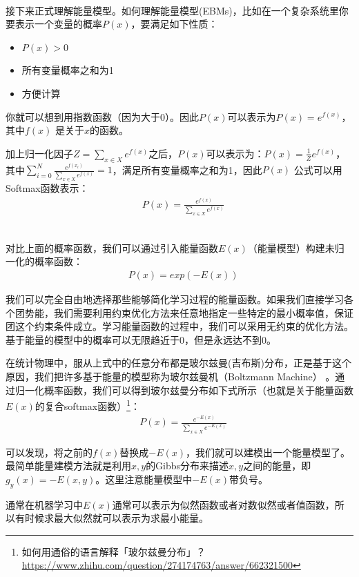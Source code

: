 \quad \\

接下来正式理解能量模型。如何理解能量模型(EBMs)，比如在一个复杂系统里你要表示一个变量的概率$P(x)$，要满足如下性质：
\begin{itemize}
    \item $P(x)> 0$
    \item 所有变量概率之和为1
    \item 方便计算
\end{itemize}

你就可以想到用指数函数（因为大于0）。因此$P(x)$可以表示为$P(x) = e^{f(x)}$，其中$f(x)$ 是关于$x$的函数。

加上归一化因子$Z = \sum_{x \in X}e^{f(x)}$之后，$P(x)$可以表示为：$P(x) = \frac{1}{Z}e^{f(x)}$，其中$\sum_{i=0}^N \frac{e^{f(x_i)}}{\sum_{x \in X} e^{f(x)}} = 1$，满足所有变量概率之和为1，因此$P(x)$ 公式可以用Softmax函数表示：
\begin{align}
&P(x) = \frac{e^{f(x)}}{\sum_{x \in X}e^{f(x)}}
\end{align}

\quad \\

对比上面的概率函数，我们可以通过引入能量函数$E(x)$（能量模型）构建未归一化的概率函数：
\begin{align}
&P(x) = exp(-E(x))
\end{align}

我们可以完全自由地选择那些能够简化学习过程的能量函数。如果我们直接学习各个团势能，我们需要利用约束优化方法来任意地指定一些特定的最小概率值，保证团这个约束条件成立。学习能量函数的过程中，我们可以采用无约束的优化方法。基于能量的模型中的概率可以无限趋近于0，但是永远达不到0。

在统计物理中，服从上式中的任意分布都是玻尔兹曼(吉布斯)分布，正是基于这个原因，我们把许多基于能量的模型称为玻尔兹曼机（Boltzmann Machine） 。通过归一化概率函数，我们可以得到玻尔兹曼分布如下式所示（也就是关于能量函数$E(x)$的复合softmax函数）\footnote{如何用通俗的语言解释「玻尔兹曼分布」？\url{https://www.zhihu.com/question/274174763/answer/662321500}}：
\begin{align}
&P(x) = \frac{e^{-E(x)}}{\sum_{x \in X}e^{-E(x)}}
\end{align}

可以发现，将之前的$f(x)$替换成$-E(x)$，我们就可以建模出一个能量模型了。最简单能量建模方法就是利用$x,y$的Gibbs分布来描述$x,y$之间的能量，即$g_y(x) = -E(x,y)$。这里注意能量模型中$-E(x)$带负号。

通常在机器学习中$E(x)$通常可以表示为似然函数或者对数似然或者值函数，所以有时候求最大似然就可以表示为求最小能量。

